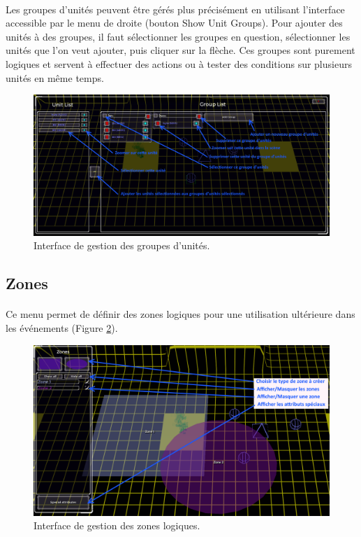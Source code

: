 \documentclass[a4paper]{article}
\begin{document}
\paragraph{ }
Les groupes d'unités peuvent être gérés plus précisément en utilisant l'interface accessible par le menu de droite (bouton Show Unit Groups). Pour ajouter des unités à des groupes, il faut sélectionner les groupes en question, sélectionner les unités que l'on veut ajouter, puis cliquer sur la flèche. Ces groupes sont purement logiques et servent à effectuer des actions ou à tester des conditions sur plusieurs unités en même temps.
\begin{figure}[H]
\centering
\includegraphics[width=\linewidth]{editor-groups.png}
\caption{Interface de gestion des groupes d'unités.}
\label{fig:editor-groups}
\end{figure}
\subsection{Zones}
\paragraph{ }
Ce menu permet de définir des zones logiques pour une utilisation ultérieure dans les événements (Figure \ref{fig:editor-zones}).
\begin{figure}[H]
\centering
\includegraphics[width=\linewidth]{editor-zones.png}
\caption{Interface de gestion des zones logiques.}
\label{fig:editor-zones}
\end{figure}
\end{document}
